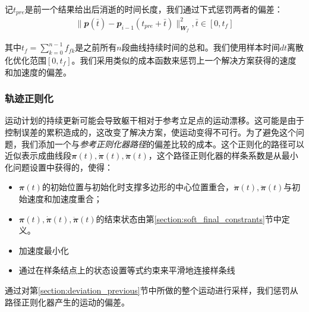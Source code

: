 记$t_{pre}$是前一个结果给出后消逝的时间长度，我们通过下式惩罚两者的偏差：
\begin{align}
    \|\mathbfit{p}(\bar t)-\mathbfit{p}_{i-1}(t_{pre}+\bar t)\|^2_{\mathbfit{W}_f}, \bar t \in[0, t_f]
\end{align}

其中$t_f=\sum_{k=0}^{n-1}f_{fk}$是之前所有$n$段曲线持续时间的总和。我们使用样本时间$dt$离散化优化范围$[0, t_f]$。我们采用类似的成本函数来惩罚上一个解决方案获得的速度和加速度的偏差。

\subsubsection{轨迹正则化}

运动计划的持续更新可能会导致躯干相对于参考立足点的运动漂移。这可能是由于控制误差的累积造成的，这改变了解决方案，使运动变得不可行。为了避免这个问题，我们添加一个与\emph{参考正则化器路径}的偏差比较的成本。这个正则化的路径可以近似表示成曲线段$\mathbfit{\pi}(t),\mathbfit{\dot \pi}(t), \mathbfit{\ddot \pi}(t)$，这个路径正则化器的样条系数是从最小化问题设置中获得的，使得：
\begin{itemize}
    \item $\mathbfit{\pi}(t)$的初始位置与初始化时支撑多边形的中心位置重合，$\mathbfit{\dot \pi}(t), \mathbfit{\ddot \pi}(t)$与初始速度和加速度重合；
    \item $\mathbfit{\pi}(t),\mathbfit{\dot \pi}(t), \mathbfit{\ddot \pi}(t)$的结束状态由第\ref{section:soft_final_constrants}节中定义。
    \item 加速度最小化
    \item 通过在样条结点上的状态设置等式约束来平滑地连接样条线
\end{itemize}

通过对第\ref{section:deviation_previous}节中所做的整个运动进行采样，我们惩罚从路径正则化器产生的运动的偏差。

    
